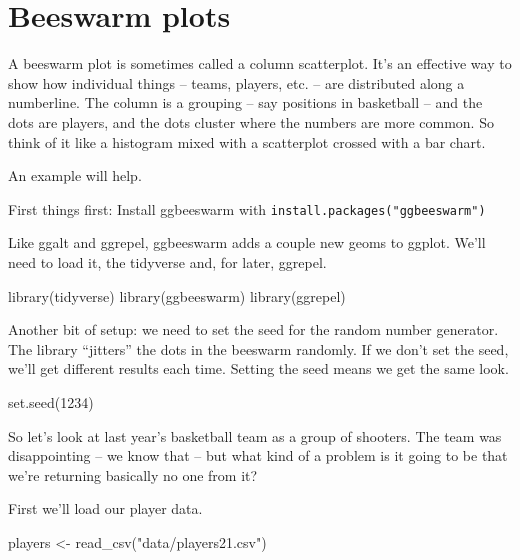 \documentclass[
  letterpaper,
  DIV=11,
  numbers=noendperiod]{scrreprt}
\newenvironment{Shaded}{\begin{snugshade}}{\end{snugshade}}
\newcommand{\DecValTok}[1]{\textcolor[rgb]{0.68,0.00,0.00}{#1}}
\newcommand{\FunctionTok}[1]{\textcolor[rgb]{0.28,0.35,0.67}{#1}}
\newcommand{\NormalTok}[1]{\textcolor[rgb]{0.00,0.23,0.31}{#1}}
\newcommand{\OtherTok}[1]{\textcolor[rgb]{0.00,0.23,0.31}{#1}}
\newcommand{\StringTok}[1]{\textcolor[rgb]{0.13,0.47,0.30}{#1}}
\begin{document}

\hypertarget{beeswarm-plots}{%
\chapter{Beeswarm plots}\label{beeswarm-plots}}

A beeswarm plot is sometimes called a column scatterplot. It's an
effective way to show how individual things -- teams, players, etc. --
are distributed along a numberline. The column is a grouping -- say
positions in basketball -- and the dots are players, and the dots
cluster where the numbers are more common. So think of it like a
histogram mixed with a scatterplot crossed with a bar chart.

An example will help.

First things first: Install ggbeeswarm with
\texttt{install.packages("ggbeeswarm")}

Like ggalt and ggrepel, ggbeeswarm adds a couple new geoms to ggplot.
We'll need to load it, the tidyverse and, for later, ggrepel.

\begin{Shaded}
\begin{Highlighting}[]
\FunctionTok{library}\NormalTok{(tidyverse)}
\FunctionTok{library}\NormalTok{(ggbeeswarm)}
\FunctionTok{library}\NormalTok{(ggrepel)}
\end{Highlighting}
\end{Shaded}

Another bit of setup: we need to set the seed for the random number
generator. The library ``jitters'' the dots in the beeswarm randomly. If
we don't set the seed, we'll get different results each time. Setting
the seed means we get the same look.

\begin{Shaded}
\begin{Highlighting}[]
\FunctionTok{set.seed}\NormalTok{(}\DecValTok{1234}\NormalTok{)}
\end{Highlighting}
\end{Shaded}

So let's look at last year's basketball team as a group of shooters. The
team was disappointing -- we know that -- but what kind of a problem is
it going to be that we're returning basically no one from it?

First we'll load our player data.

\begin{Shaded}
\begin{Highlighting}[]
\NormalTok{players }\OtherTok{\textless{}{-}} \FunctionTok{read\_csv}\NormalTok{(}\StringTok{"data/players21.csv"}\NormalTok{)}
\end{Highlighting}
\end{Shaded}
\end{document}

